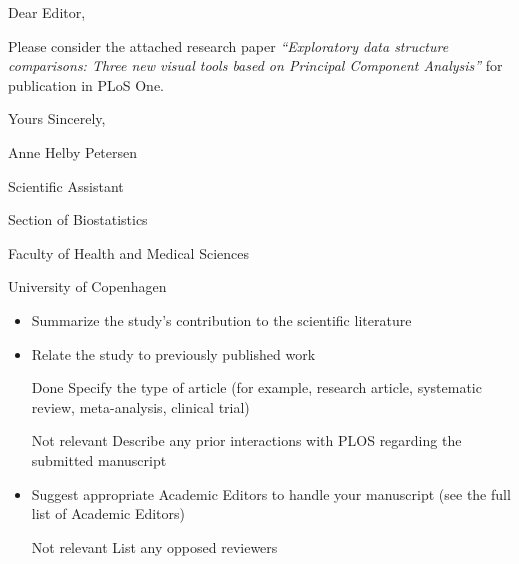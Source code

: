\documentclass[titlepage,11pt,twoside]{article}
\begin{document}
Dear Editor,

\medskip

Please consider the attached research paper \emph{``Exploratory data structure comparisons: Three new visual tools based on Principal Component Analysis''} for publication in PLoS One.


\bigskip

Yours Sincerely,

\bigskip\bigskip

Anne Helby Petersen

Scientific Assistant

Section of Biostatistics

Faculty of Health and Medical Sciences

University of Copenhagen


\begin{itemize}
\item Summarize the study’s contribution to the scientific literature
\item Relate the study to previously published work
\item[Done] Specify the type of article (for example, research article, systematic review, meta-analysis, clinical trial)
\item[Not relevant] Describe any prior interactions with PLOS regarding the submitted manuscript
\item Suggest appropriate Academic Editors to handle your manuscript (see the full list of Academic Editors)
\item[Not relevant] List any opposed reviewers
\end{itemize}
\end{document}
